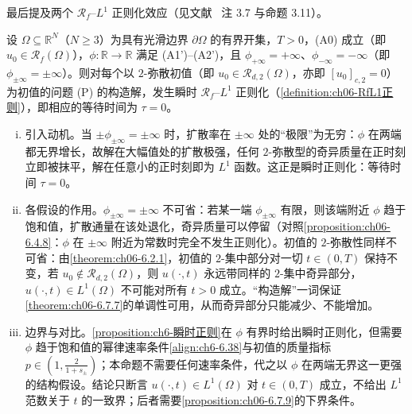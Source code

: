 \documentclass[../../main.tex]{subfiles}%
\begin{document}
最后提及两个 $\mathscr{R}_f$--$L^1$ 正则化效应（见文献~\cite{ref87} 注 3.7 与命题 3.11）。

\begin{proposition}\label{proposition:ch06-6.7.8}
设 $\Omega\subseteq\mathbb{R}^N$（$N\geqslant3$）为具有光滑边界 $\partial\Omega$ 的有界开集，$T>0$，(A0) 成立（即 $u_0\in\mathscr{R}_f(\Omega)$），$\phi:\mathbb{R}\to\mathbb{R}$ 满足 (A1')--(A2')，且 $\phi_{+\infty}=+\infty$、$\phi_{-\infty}=-\infty$（即 $\phi_{\pm\infty}=\pm\infty$）。则对每个以 $2$-弥散初值（即 $u_0\in\mathscr{R}_{d,2}(\Omega)$，亦即 $[u_0]_{c,2}=0$）为初值的问题 (P) 的构造解，发生瞬时 $\mathscr{R}_f$--$L^1$ 正则化（\cref{definition:ch06-RfL1正则}），即相应的等待时间为 $\tau=0$。
\end{proposition}

\begin{remark}\label{remark:ch06-6.7.8动机}
\begin{enumerate}[(i)]
\item 引入动机。当 $\pm\phi_{\pm\infty}=\pm\infty$ 时，扩散率在 $\pm\infty$ 处的“极限”为无穷：$\phi$ 在两端都无界增长，故解在大幅值处的扩散极强，任何 $2$-弥散型的奇异质量在正时刻立即被抹平，解在任意小的正时刻即为 $L^1$ 函数。这正是瞬时正则化：等待时间 $\tau=0$。

\item 各假设的作用。$\phi_{\pm\infty}=\pm\infty$ 不可省：若某一端 $\phi_{\pm\infty}$ 有限，则该端附近 $\phi$ 趋于饱和值，扩散通量在该处退化，奇异质量可以停留（对照\cref{proposition:ch06-6.4.8}：$\phi$ 在 $\pm\infty$ 附近为常数时完全不发生正则化）。初值的 $2$-弥散性同样不可省：由\cref{theorem:ch06-6.2.1}，初值的 $2$-集中部分对一切 $t\in(0,T)$ 保持不变，若 $u_0\notin\mathscr{R}_{d,2}(\Omega)$，则 $u(\cdot,t)$ 永远带同样的 $2$-集中奇异部分，$u(\cdot,t)\in L^1(\Omega)$ 不可能对所有 $t>0$ 成立。“构造解”一词保证\cref{theorem:ch06-6.7.7}的单调性可用，从而奇异部分只能减少、不能增加。

\item 边界与对比。\cref{proposition:ch6-瞬时正则}在 $\phi$ 有界时给出瞬时正则化，但需要 $\phi$ 趋于饱和值的幂律速率条件\eqref{align:ch6-6.38}与初值的质量指标 $p\in(1,\frac{2}{1+s_\pm})$；本命题不需要任何速率条件，代之以 $\phi$ 在两端无界这一更强的结构假设。结论只断言 $u(\cdot,t)\in L^1(\Omega)$ 对 $t\in(0,T)$ 成立，不给出 $L^1$ 范数关于 $t$ 的一致界；后者需要\cref{proposition:ch06-6.7.9}的下界条件。
\end{enumerate}
\end{remark}
\end{document}
